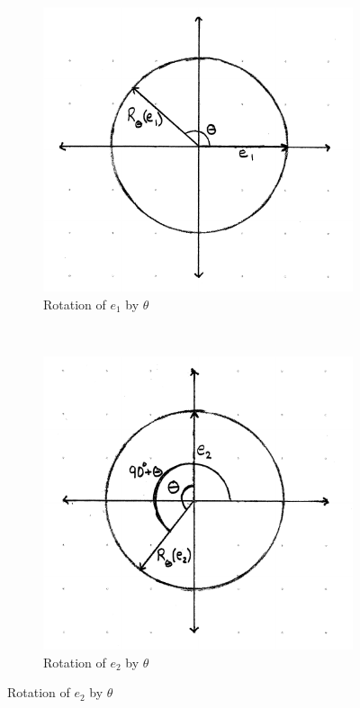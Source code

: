 \documentclass[12pt,letter]{article}
\begin{document}
\begin{figure}[h]
	\caption{Rotation of Basis Vectors $e_1$ and $e_2$}
	\centering
	\begin{subfigure}[h]{0.45\textwidth}
		\includegraphics[width = \textwidth]{rotation_e1.pdf}
		\caption{Rotation of $e_1$ by $\theta$}
		\label{fig:rotate_e1}
	\end{subfigure}
	~
	\begin{subfigure}[h]{0.45\textwidth}
		\includegraphics[width = \textwidth]{rotation_e2.pdf}
		\caption{Rotation of $e_2$ by $\theta$}
		\label{fig:rotate_e2}
	\end{subfigure}
	\label{fig:rotations}
\end{figure}
\end{document}
